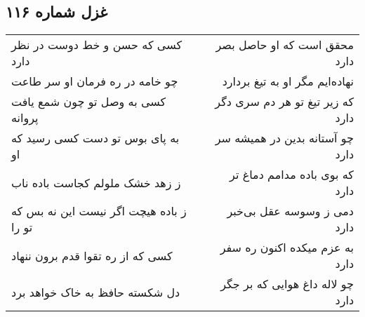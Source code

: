 \begin{center}
\section*{غزل شماره ۱۱۶}
\label{sec:sh116}
\begin{longtable}{l p{0.5cm} r}
کسی که حسن و خط دوست در نظر دارد
&&
محقق است که او حاصل بصر دارد
\\
چو خامه در ره فرمان او سر طاعت
&&
نهاده‌ایم مگر او به تیغ بردارد
\\
کسی به وصل تو چون شمع یافت پروانه
&&
که زیر تیغ تو هر دم سری دگر دارد
\\
به پای بوس تو دست کسی رسید که او
&&
چو آستانه بدین در همیشه سر دارد
\\
ز زهد خشک ملولم کجاست باده ناب
&&
که بوی باده مدامم دماغ تر دارد
\\
ز باده هیچت اگر نیست این نه بس که تو را
&&
دمی ز وسوسه عقل بی‌خبر دارد
\\
کسی که از ره تقوا قدم برون ننهاد
&&
به عزم میکده اکنون ره سفر دارد
\\
دل شکسته حافظ به خاک خواهد برد
&&
چو لاله داغ هوایی که بر جگر دارد
\\
\end{longtable}
\end{center}
